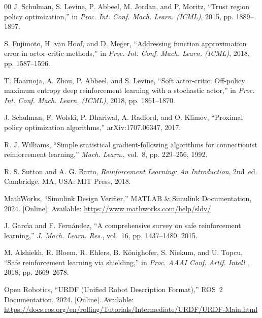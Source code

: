 \documentclass{ieeeaccess}
\begin{document}
\begin{thebibliography}{00}
J. Schulman, S. Levine, P. Abbeel, M. Jordan, and P. Moritz, ``Trust region policy
optimization,'' in \emph{Proc. Int. Conf. Mach. Learn. (ICML)}, 2015, pp. 1889--1897.



S. Fujimoto, H. van Hoof, and D. Meger, ``Addressing function approximation error in actor-critic
methods,'' in \emph{Proc. Int. Conf. Mach. Learn. (ICML)}, 2018, pp. 1587--1596.



T. Haarnoja, A. Zhou, P. Abbeel, and S. Levine, ``Soft actor-critic: Off-policy maximum entropy
deep reinforcement learning with a stochastic actor,'' in \emph{Proc. Int. Conf. Mach. Learn. (ICML)},
2018, pp. 1861--1870.



J. Schulman, F. Wolski, P. Dhariwal, A. Radford, and O. Klimov, ``Proximal policy optimization
algorithms,'' arXiv:1707.06347, 2017.



 R. J. Williams, ``Simple statistical gradient-following algorithms for connectionist
reinforcement learning,'' \emph{Mach. Learn.}, vol.~8, pp. 229--256, 1992.



R. S. Sutton and A. G. Barto, \emph{Reinforcement Learning: An Introduction}, 2nd~ed. Cambridge, MA,
USA: MIT Press, 2018.



 MathWorks, ``Simulink Design Verifier,'' MATLAB \& Simulink Documentation, 2024. [Online].
Available: \url{https://www.mathworks.com/help/sldv/}



 J. Garc{\'\i}a and F. Fern{\'a}ndez, ``A comprehensive survey on safe reinforcement
learning,'' \emph{J. Mach. Learn. Res.}, vol.~16, pp. 1437--1480, 2015.



M. Alshiekh, R. Bloem, R. Ehlers, B. K{\"o}nighofer, S. Niekum, and U. Topcu, ``Safe
reinforcement learning via shielding,'' in \emph{Proc. AAAI Conf. Artif. Intell.}, 2018, pp. 2669--2678.



 Open Robotics, ``URDF (Unified Robot Description Format),'' ROS~2 Documentation,
2024. [Online]. Available:
\url{https://docs.ros.org/en/rolling/Tutorials/Intermediate/URDF/URDF-Main.html}




\end{thebibliography}
\end{document}
